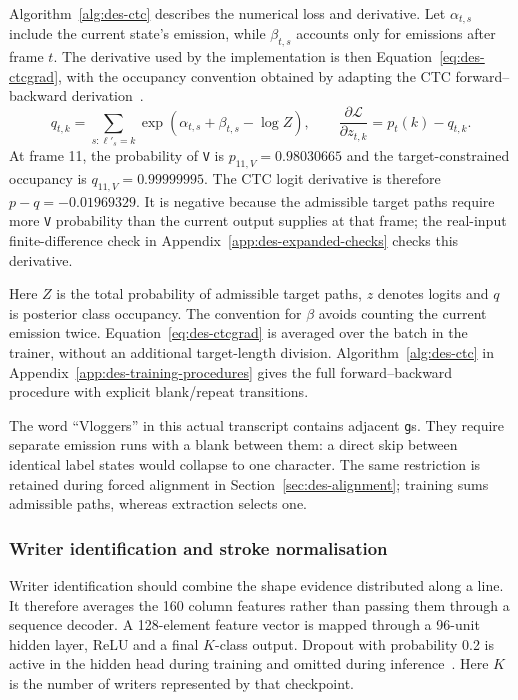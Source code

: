 Algorithm~\ref{alg:des-ctc} describes the numerical loss and derivative. Let $\alpha_{t,s}$ include the current state's emission, while $\beta_{t,s}$ accounts only for emissions after frame $t$. The derivative used by the implementation is then Equation~\ref{eq:des-ctcgrad}, with the occupancy convention obtained by adapting the CTC forward--backward derivation~\cite[PDF pp.~5--6]{graves2006}.
\begin{equation}
q_{t,k}=\sum_{s:\ell'_s=k}\exp(\alpha_{t,s}+\beta_{t,s}-\log Z),
\qquad \frac{\partial\mathcal L}{\partial z_{t,k}}=p_t(k)-q_{t,k}.
\label{eq:des-ctcgrad}
\end{equation}
At frame 11, the probability of \texttt{V} is $p_{11,V}=0.98030665$ and the target-constrained occupancy is $q_{11,V}=0.99999995$. The CTC logit derivative is therefore $p-q=-0.01969329$. It is negative because the admissible target paths require more \texttt{V} probability than the current output supplies at that frame; the real-input finite-difference check in Appendix~\ref{app:des-expanded-checks} checks this derivative.

Here $Z$ is the total probability of admissible target paths, $z$ denotes logits and $q$ is posterior class occupancy. The convention for $\beta$ avoids counting the current emission twice. Equation~\ref{eq:des-ctcgrad} is averaged over the batch in the trainer, without an additional target-length division.
Algorithm~\ref{alg:des-ctc} in Appendix~\ref{app:des-training-procedures} gives the full forward--backward procedure with explicit blank/repeat transitions.


The word ``Vloggers'' in this actual transcript contains adjacent \texttt{g}s. They require separate emission runs with a blank between them: a direct skip between identical label states would collapse to one character. The same restriction is retained during forced alignment in Section~\ref{sec:des-alignment}; training sums admissible paths, whereas extraction selects one.

\subsubsection{Writer identification and stroke normalisation}
\label{sec:des-shapenamer}
Writer identification should combine the shape evidence distributed along a line. It therefore averages the 160 column features rather than passing them through a sequence decoder. A 128-element feature vector is mapped through a 96-unit hidden layer, ReLU and a final $K$-class output. Dropout with probability 0.2 is active in the hidden head during training and omitted during inference~\cite[pp.~1931, 1934]{srivastava2014}. Here $K$ is the number of writers represented by that checkpoint.

